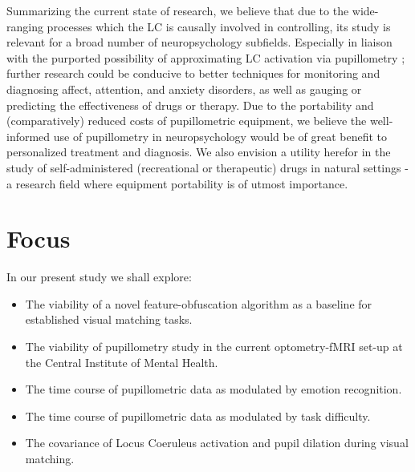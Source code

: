 	Summarizing the current state of research, we believe that due to the wide-ranging processes which the LC is causally involved in controlling, its study is relevant for a broad number of neuropsychology subfields.
	Especially in liaison with the purported possibility of approximating LC activation via pupillometry \citep{Gilzenrat2010,Murphy2011}; further research could be conducive to better techniques for monitoring and diagnosing affect, attention, and anxiety disorders, as well as gauging or predicting the effectiveness of drugs or therapy.
	Due to the portability \citep{Bradley2010} and (comparatively) reduced costs of pupillometric equipment, we believe the well-informed use of pupillometry in neuropsychology would be of great benefit to personalized treatment and diagnosis.
	We also envision a utility herefor in the study of self-administered (recreational or therapeutic) drugs in natural settings - a research field where equipment portability is of utmost importance.
    \section{Focus}
	In our present study we shall explore:
	\begin{itemize}
	    \item The viability of a novel feature-obfuscation algorithm as a baseline for established visual matching tasks.
	    \item The viability of pupillometry study in the current optometry-fMRI set-up at the Central Institute of Mental Health.
	    \item The time course of pupillometric data as modulated by emotion recognition.
	    \item The time course of pupillometric data as modulated by task difficulty.
	    \item The covariance of Locus Coeruleus activation and pupil dilation during visual matching.
	\end{itemize}
	
